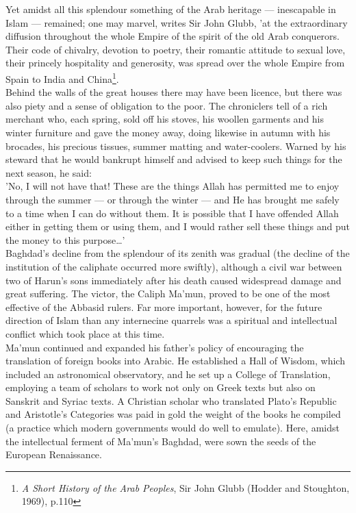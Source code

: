 \documentclass[11pt, b5paper, twoside]{book}
\begin{document}
Yet amidst all this splendour something of the Arab heritage --- inescapable in Islam --- remained; one 
may marvel, writes Sir John Glubb, 'at the extraordinary diffusion throughout the whole Empire of the 
spirit of the old Arab conquerors. Their code of chivalry, devotion to poetry, their romantic 
attitude to sexual love, their princely hospitality and generosity, was spread over the whole Empire 
from Spain to India and China\footnote{\emph{A Short History of the Arab Peoples}, Sir John Glubb (Hodder and Stoughton, 1969), p.110}. \\

Behind the walls of the great houses there may have been licence, but there was also piety and a 
sense of obligation to the poor. The chroniclers tell of a rich merchant who, each spring, sold off 
his stoves, his woollen garments and his winter furniture and gave the money away, doing likewise in 
autumn with his brocades, his precious tissues, summer matting and water-coolers. Warned by his 
steward that he would bankrupt himself and advised to keep such things for the next season, he said: \\

'No, I will not have that! These are the things Allah has permitted me to enjoy through the summer --- 
or through the winter --- and He has brought me safely to a time when I can do without them. It is 
possible that I have offended Allah either in getting them or using them, and I would rather sell 
these things and put the money to this purpose\ldots{}' \\

Baghdad's decline from the splendour of its zenith was gradual (the decline of the institution of the 
caliphate occurred more swiftly), although a civil war between two of Harun's sons immediately after 
his death caused widespread damage and great suffering. The victor, the Caliph Ma'mun, proved to be 
one of the most effective of the Abbasid rulers. Far more important, however, for the future 
direction of Islam than any internecine quarrels was a spiritual and intellectual conflict which took 
place at this time. \\

Ma'mun continued and expanded his father's policy of encouraging the translation of foreign books 
into Arabic. He established a Hall of Wisdom, which included an astronomical observatory, and he set 
up a College of Translation, employing a team of scholars to work not only on Greek texts but also on 
Sanskrit and Syriac texts. A Christian scholar who translated Plato's Republic and Aristotle's 
Categories was paid in gold the weight of the books he compiled (a practice which modern governments 
would do well to emulate). Here, amidst the intellectual ferment of Ma'mun's Baghdad, were sown the 
seeds of the European Renaissance. \\
\end{document}
